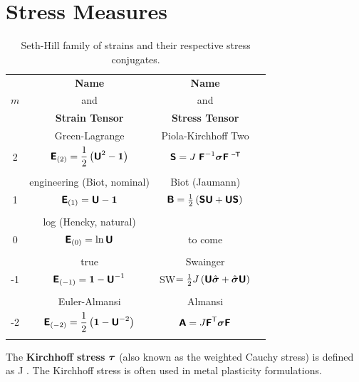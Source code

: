\section{Stress Measures}
\begin{table}[htb]
\caption{Seth-Hill family of strains 
and their respective stress conjugates.}
\label{tab:table_of_conjugate_stress}
\begin{center}
\begin{tabular}{|c|c|c|c|} \hline
     & {\bf Name} & {\bf Name} \\ 
 $m$ & and & and \\ 
     & {\bf Strain Tensor} & {\bf Stress Tensor} \\ \hline \hline
 & Green-Lagrange & Piola-Kirchhoff Two \\
 2  
   & $\mbox{\sffamily\bfseries E}_{(2)} = \displaystyle\frac{1}{2}\left(\mbox{\sffamily\bfseries U}^2 - \mbox{\boldmath $1$}\right)$ 
   & $\mbox{\sffamily\bfseries S} = J \;\mbox{\sffamily\bfseries F}^{-1} \mbox{\boldmath $\sigma$} \mbox{\sffamily\bfseries F}\;^{\mbox{\scriptsize \sffamily --T}}$
   \\
   & & \\ \hline
 & engineering (Biot, nominal) & Biot (Jaumann) \\
 1  
   & $\mbox{\sffamily\bfseries E}_{(1)} = \mbox{\sffamily\bfseries U} - \mbox{\boldmath $1$}$
   & $\mbox{\sffamily\bfseries B} = 
   \frac{1}{2} \left(\mbox{\sffamily\bfseries S} \mbox{\sffamily\bfseries U} + \mbox{\sffamily\bfseries U} \mbox{\sffamily\bfseries S} \right)$
  \\
   & & \\ \hline
 & log (Hencky, natural) & \\
 0  
   & $\mbox{\sffamily\bfseries E}_{(0)} = \ln\mbox{\sffamily\bfseries U}$
   & to come
   \\
   & & \\ \hline
 & true & Swainger \\
 -1  
   & $\mbox{\sffamily\bfseries E}_{(-1)} = \mbox{\boldmath $1$} - \mbox{\sffamily\bfseries U}^{-1}$
   & {\sc SW}$= \frac{1}{2} J \left(\mbox{\sffamily\bfseries U} \hat{\mbox{\boldmath $\sigma$}} + 
           \hat{\mbox{\boldmath $\sigma$}} \mbox{\sffamily\bfseries U} \right)$
   \\
   & & \\ \hline
 & Euler-Almansi & Almansi\\
 -2  
   & $\mbox{\sffamily\bfseries E}_{(-2)} = \displaystyle\frac{1}{2}\left(\mbox{\boldmath $1$} - \mbox{\sffamily\bfseries U}^{-2}\right)$
   & $\mbox{\sffamily\bfseries A} = J \mbox{\sffamily\bfseries F}^{\mbox{\scriptsize \sffamily T}} \mbox{\boldmath $\sigma$} \mbox{\sffamily\bfseries F}$
   \\
   & & \\ \hline
\end{tabular}
\end{center}
\end{table}

The {\bf Kirchhoff stress} $\mbox{\boldmath $\tau$}$ (also known as the 
weighted Cauchy stress) is defined as
\be
 \ve{\tau}  J \; \ve{\sigma}. 
\ee
The Kirchhoff stress is often used in metal plasticity formulations.


